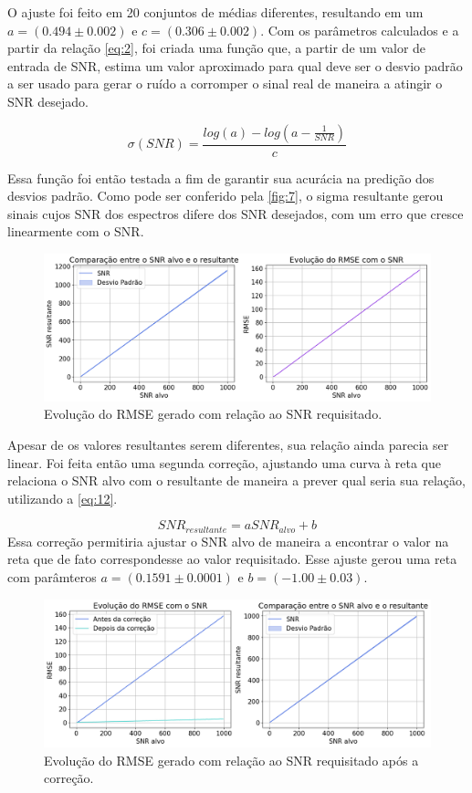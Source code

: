 \documentclass[
12pt,		
twoside, 
a4paper,
chapter=TITLE,
english,			
brazil]{USPSC-classe/USPSC}
\begin{document}
O ajuste foi feito em 20 conjuntos de médias diferentes, resultando em um $a = (0.494 \pm 0.002)$ e $c = (0.306 \pm 0.002)$. Com os parâmetros calculados e a partir da relação \autoref{eq:2}, foi criada uma função que, a partir de um valor de entrada de SNR, estima um valor aproximado para qual deve ser o desvio padrão a ser usado para 
gerar o ruído a corromper o sinal real de maneira a atingir o SNR desejado.

\begin{equation} \label{eq:10}
    \sigma (SNR) = \frac{log(a) - log(a - \frac{1}{SNR})}{c}
\end{equation}

Essa função foi então testada a fim de garantir sua acurácia na predição dos desvios padrão. Como pode ser conferido pela \autoref{fig:7}, o sigma resultante gerou sinais cujos SNR dos espectros difere dos SNR desejados, com um erro que cresce linearmente com o SNR.

\begin{figure} [H]
    \includegraphics[scale=0.4]{evolucao-rmse-errado.png}
    \centering
    \caption{Evolução do RMSE gerado com relação ao SNR requisitado.}
    \label{fig:10}
\end{figure}

Apesar de os valores resultantes serem diferentes, sua relação ainda parecia ser linear. 
Foi feita então uma segunda correção, ajustando uma curva à reta que relaciona o SNR alvo com 
o resultante de maneira a prever qual seria sua relação, utilizando a \autoref{eq:12}.

\begin{equation} \label{eq:12}
    SNR_{resultante} = a SNR_{alvo} + b    
\end{equation}
Essa correção permitiria ajustar o SNR alvo de maneira a encontrar o valor na reta que de 
fato correspondesse ao valor requisitado. Esse ajuste gerou uma reta com parâmteros 
$a = (0.1591 \pm 0.0001)$ e $b = (-1.00 \pm 0.03)$.
\begin{figure} [H]
    \includegraphics[scale=0.45]{evolucao-rmse.png}
    \centering
    \caption{Evolução do RMSE gerado com relação ao SNR requisitado após a correção.}
    \label{fig:8}
\end{figure}
\end{document}
